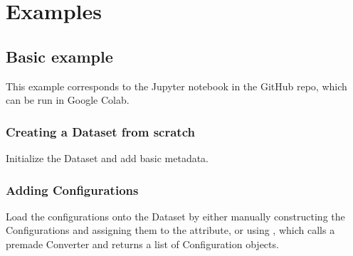 \documentclass[letterpaper,10pt,english]{sphinxmanual}
\begin{document}
\chapter{Examples}
\label{\detokenize{examples:examples}}\label{\detokenize{examples::doc}}

\section{Basic example}
\label{\detokenize{basic_example:basic-example}}\label{\detokenize{basic_example::doc}}
\sphinxAtStartPar
This example corresponds to the 
Jupyter notebook in the GitHub repo, which can be run in Google Colab.


\subsection{Creating a Dataset from scratch}
\label{\detokenize{basic_example:creating-a-dataset-from-scratch}}
\sphinxAtStartPar
Initialize the Dataset and add basic metadata.

\begin{sphinxVerbatim}[commandchars=\\\{\}]
   

  

  \PYG{p}{[}
\PYG{p}{]}

  \PYG{p}{[}
\PYG{p}{]}

  
\end{sphinxVerbatim}


\subsection{Adding Configurations}
\label{\detokenize{basic_example:adding-configurations}}
\sphinxAtStartPar
Load the configurations onto the Dataset by either manually constructing the
Configurations and assigning them to the  attribute, or
using {\hyperref[\detokenize{dataset:colabfit.tools.dataset.load_data}]{}}, which calls a pre\sphinxhyphen{}made Converter and
returns a list of Configuration objects.
\end{document}
